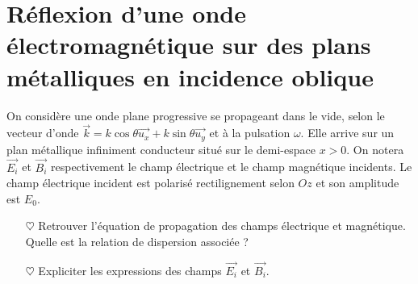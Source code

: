 \documentclass{report}
\begin{document}
\section*{Réflexion d'une onde électromagnétique sur des plans métalliques en incidence oblique}

On considère une onde plane progressive se propageant dans le vide, selon le vecteur d'onde $\vec{k}=k\cos\theta\vec{u_x}+k\sin\theta\vec{u_y}$ et à la pulsation $\omega$. Elle arrive sur un plan métallique infiniment conducteur situé sur le demi-espace $x>0$. On notera $\vec{E_i}$ et $\vec{B_i}$ respectivement le champ électrique et le champ magnétique incidents. Le champ électrique incident est polarisé rectilignement selon $Oz$ et son amplitude est $E_0$.

\begin{itemize}
		
	\item[$\heartsuit$]	Retrouver l'équation de propagation des champs électrique et magnétique. Quelle est la relation de dispersion associée ? 
	
	\item[$\heartsuit$] Expliciter les expressions des champs $\vec{E_i}$ et $\vec{B_i}$.
	
\end{itemize}
\end{document}
